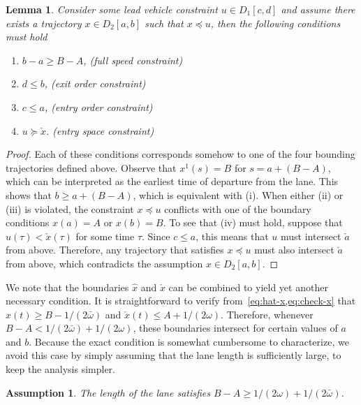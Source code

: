 \documentclass[a4paper]{article}
\theoremstyle{definition}
\theoremstyle{plain}
\newtheorem{lemma}{Lemma\hspace{0.25em}\ignorespaces}
\newtheorem{assump}{Assumption\hspace{0.25em}\ignorespaces}
\begin{document}
\begin{lemma}\label{lemma:necessary-conditions}
  Consider some lead vehicle constraint $u \in D_{1}[c,d]$ and assume there
  exists a trajectory $x \in D_{2}[a, b]$ such that $x \preceq u$, then the following
  conditions must hold \TabPositions{3cm}
  \begin{enumerate}[label=(\roman*)\quad,leftmargin=5em,midpenalty=5]
    \item $b-a \geq B-A$, \tab (full speed constraint)
    \item $d \leq b$, \tab (exit order constraint)
    \item $c \leq a$, \tab (entry order constraint)
    \item $u \succeq \check{x}$. \tab (entry space constraint)
  \end{enumerate}
\end{lemma}
\pagebreak[1]
\begin{proof}
  Each of these conditions corresponds somehow to one of the four bounding
  trajectories defined above.
  Observe that $x^{1}(s) = B$ for $s = a + (B-A)$, which can be interpreted as
  the earliest time of departure from the lane. This shows that
  $b \geq a + (B-A)$, which is equivalent with (i).
  When either (ii) or (iii) is violated, the constraint $x \preceq u$ conflicts
  with one of the boundary conditions $x(a) = A$ or $x(b) = B$. To see that (iv)
  must hold, suppose that $u(\tau) < \check{x}(\tau)$ for some time $\tau$. Since
  $c \leq a$, this means that $u$ must intersect $\check{a}$ from above. Therefore,
  any trajectory that satisfies $x \preceq u$ must also intersect $\check{a}$
  from above, which contradicts the assumption $x \in D_{2}[a,b]$.
\end{proof}

We note that the boundaries $\hat{x}$ and $\check{x}$ can be combined to
yield yet another necessary condition.
%
It is straightforward to verify from~\cref{eq:hat-x,eq:check-x} that
$\hat{x}(t) \geq B - 1/(2\bar{\omega})$ and $\check{x}(t) \leq A + 1/(2\omega)$.
%
Therefore, whenever $B - A < 1/(2\bar{\omega}) + 1/(2\omega)$, these boundaries intersect
for certain values of $a$ and $b$.
%
Because the exact condition is somewhat cumbersome to characterize, we avoid
this case by simply assuming that the lane length is sufficiently large, to keep
the analysis simpler.

\begin{assump}\label{assump:lane-length}
  The length of the lane satisfies $B - A \geq 1/(2\omega) + 1/(2\bar{\omega})$.
\end{assump}
\end{document}
